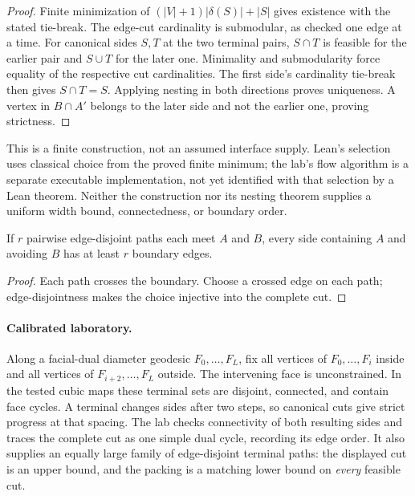 \begin{proof}
Finite minimization of $(|V|+1)|\delta(S)|+|S|$ gives existence with the
stated tie-break.  The edge-cut cardinality is submodular, as checked one
edge at a time.  For canonical sides $S,T$ at the two terminal pairs,
$S\cap T$ is feasible for the earlier pair and $S\cup T$ for the later
one.  Minimality and submodularity force equality of the respective cut
cardinalities.  The first side's cardinality tie-break then gives
$S\cap T=S$.  Applying nesting in both directions proves uniqueness.
A vertex in $B\cap A'$ belongs to the later side and not the earlier one,
proving strictness.
\end{proof}

This is a finite construction, not an assumed interface supply.  Lean's
selection uses classical choice from the proved finite minimum; the lab's
flow algorithm is a separate executable implementation, not yet identified
with that selection by a Lean theorem.  Neither the construction nor its
nesting theorem supplies a uniform width bound, connectedness, or boundary
order.

\begin{lemma}
\label{lem:terminal-path-packing-bound}
If $r$ pairwise edge-disjoint paths each meet $A$ and $B$, every side
containing $A$ and avoiding $B$ has at least $r$ boundary edges.
\end{lemma}

\begin{proof}
Each path crosses the boundary.  Choose a crossed edge on each path;
edge-disjointness makes the choice injective into the complete cut.
\end{proof}

\paragraph{Calibrated laboratory.}
Along a facial-dual diameter geodesic $F_0,\ldots,F_L$, fix all vertices
of $F_0,\ldots,F_i$ inside and all vertices of
$F_{i+2},\ldots,F_L$ outside.  The intervening face is unconstrained.
In the tested cubic maps these terminal sets are disjoint, connected, and
contain face cycles.  A terminal changes sides after two steps, so canonical
cuts give strict progress at that spacing.  The lab checks connectivity of
both resulting sides and traces the complete cut as one simple dual cycle,
recording its edge order.  It also supplies an equally large family of
edge-disjoint terminal paths: the displayed cut is an upper bound, and the
packing is a matching lower bound on \emph{every} feasible cut.

